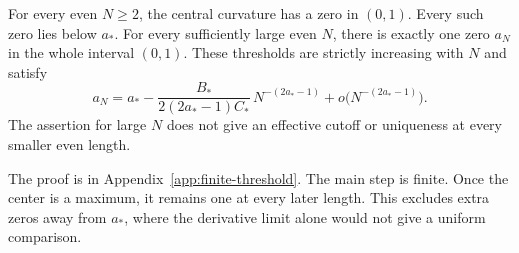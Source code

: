 \begin{samepage}
\begin{proposition}\label{prop:finite-threshold-location}
For every even $N\ge2$, the central curvature has a zero in $(0,1)$.
Every such zero lies below $a_*$. For every sufficiently large
even $N$, there is exactly one zero $a_N$ in the whole interval $(0,1)$.
These thresholds are strictly increasing with $N$ and satisfy
\begin{equation}\label{eq:finite-threshold-shift}
 a_N=a_*-\frac{B_*}{2(2a_*-1)C_*}\,N^{-(2a_*-1)}
          +o\bigl(N^{-(2a_*-1)}\bigr).
\end{equation}
The assertion for large $N$ does not give an effective cutoff or
uniqueness at every smaller even length.
\end{proposition}
\end{samepage}

The proof is in Appendix~\ref{app:finite-threshold}. The main step is
finite. Once the center is a maximum, it remains one at every later
length. This excludes extra zeros away from $a_*$, where the derivative
limit alone would not give a uniform comparison.
